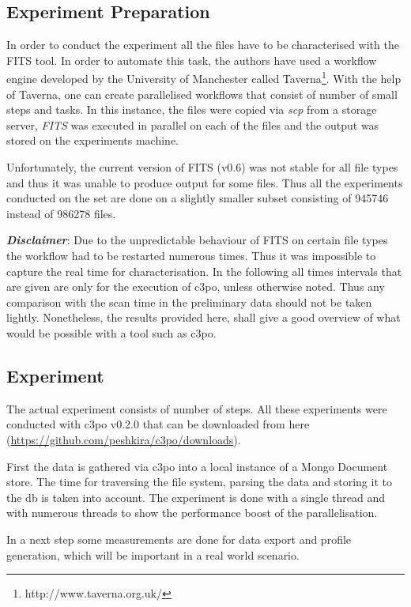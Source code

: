 \subsection{Experiment Preparation}
In order to conduct the experiment all the files have to be characterised with the FITS tool. In order to automate this task, the authors have used a workflow engine developed by the University of Manchester called Taverna\footnote{http://www.taverna.org.uk/}. With the help of Taverna, one can create parallelised workflows that consist of number of small steps and tasks. In this instance, the files were copied via \textit{scp} from a storage server, \textit{FITS} was executed in parallel on each of the files and the output was stored on the experiments machine.

Unfortunately, the current version of FITS (v0.6) was not stable for all file types and thus it was unable to produce output for some files. Thus all the experiments conducted on the set are done on a slightly smaller subset consisting of 945746 instead of 986278 files.

\textbf{\textit{Disclaimer}}: Due to the unpredictable behaviour of FITS on certain file types the workflow had to be restarted numerous times. Thus it was impossible to capture the real time for characterisation. In the following all times intervals that are given are only for the execution of c3po, unless otherwise noted. Thus any comparison with the scan time in the preliminary data should not be taken lightly. Nonetheless, the results provided here, shall give a good overview of what would be possible with a tool such as c3po.

\subsection{Experiment}
The actual experiment consists of number of steps. All these experiments were conducted with c3po v0.2.0 that can be downloaded from here (\url{https://github.com/peshkira/c3po/downloads}). 

First the data is gathered via c3po into a local instance of a Mongo Document store. The time for traversing the file system, parsing the data and storing it to the db is taken into account. The experiment is done with a single thread and with numerous threads to show the performance boost of the parallelisation.

In a next step some measurements are done for data export and profile generation, which will be important in a real world scenario.

